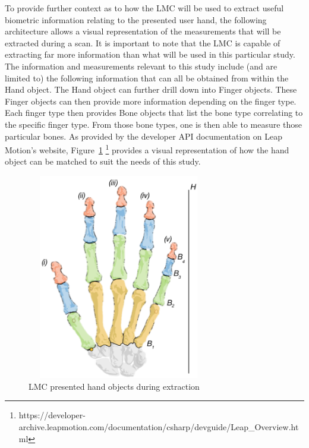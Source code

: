 To provide further context as to how the LMC will be used to extract useful biometric information relating to the presented user hand, the following architecture allows a visual representation of the measurements that will be extracted during a scan. It is important to note that the LMC is capable of extracting far more information than what will be used in this particular study. The information and measurements relevant to this study include (and are limited to) the following information that can all be obtained from within the Hand object. The Hand object can further drill down into Finger objects. These Finger objects can then provide more information depending on the finger type. Each finger type then provides Bone objects that list the bone type correlating to the specific finger type. From those bone types, one is then able to measure those particular bones.  As provided by the developer API documentation on Leap Motion’s website, Figure~\ref{fig:LMC presented hand objects during extraction} \footnote{https://developer-archive.leapmotion.com/documentation/csharp/devguide/Leap_Overview.html} provides a visual representation of how the hand object can be matched to suit the needs of this study.

    
    \begin{figure}[htbp!] 
    \centering    
    \includegraphics[width=8cm,height=9cm,keepaspectratio]{Chapter3/Figs/LMC_presented_hand_objects_during_extraction.png}
    \caption[LMC presented hand objects during extraction]{LMC presented hand objects during extraction}
    \label{fig:LMC presented hand objects during extraction}
    \end{figure}

